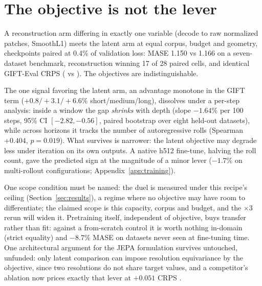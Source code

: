 \section{The objective is not the lever}
\label{sec:objective}

A reconstruction arm differing in exactly one variable (decode to raw
normalized patches, SmoothL1) meets the latent arm at equal corpus,
budget and geometry, checkpoints paired at 0.4\% of validation loss:
MASE 1.150 vs 1.166 on a seven-dataset benchmark, reconstruction winning
17 of 28 paired cells, and identical GIFT-Eval CRPS
( vs ). The objectives are
indistinguishable.

The one signal favoring the latent arm, an advantage monotone in the
GIFT term ($+0.8/+3.1/+6.6\%$ short/medium/long), dissolves under a
per-step analysis: inside a window the gap \emph{shrinks} with depth
(slope $-1.64\%$ per 100 steps, 95\% CI $[-2.82,-0.56]$, paired
bootstrap over eight held-out datasets), while across horizons it tracks
the number of autoregressive rolls (Spearman $+0.404$, $p=0.019$). What
survives is narrower: the latent objective may degrade less under
iteration on its own outputs. A native h512 fine-tune, halving the roll
count, gave the predicted sign at the magnitude of a minor lever
($-1.7\%$ on multi-rollout configurations;
Appendix~\ref{app:training}).

One scope condition must be named: the duel is measured under this
recipe's ceiling (Section~\ref{sec:results}), a regime where no
objective may have room to differentiate; the claimed scope is this
capacity, corpus and budget, and the $\times 3$ rerun will widen it.
Pretraining itself, independent of objective, buys transfer rather than
fit: against a from-scratch control it is worth nothing in-domain
(strict equality) and $-8.7\%$ MASE on datasets never seen at
fine-tuning time. One architectural argument for the JEPA formulation
survives untouched, unfunded: only latent comparison can impose
resolution equivariance by the objective, since two resolutions do not
share target values, and a competitor's ablation now prices exactly
that lever at $+0.051$ CRPS \citep{flowstate2025}.
